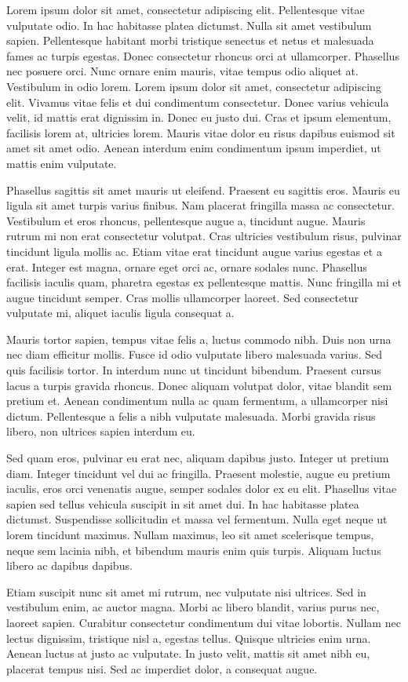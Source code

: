 \documentclass{article}
\begin{document}
Lorem ipsum dolor sit amet, consectetur adipiscing elit. Pellentesque vitae vulputate odio. In hac habitasse platea dictumst. Nulla sit amet vestibulum sapien. Pellentesque habitant morbi tristique senectus et netus et malesuada fames ac turpis egestas. Donec consectetur rhoncus orci at ullamcorper. Phasellus nec posuere orci. Nunc ornare enim mauris, vitae tempus odio aliquet at. Vestibulum in odio lorem. Lorem ipsum dolor sit amet, consectetur adipiscing elit. Vivamus vitae felis et dui condimentum consectetur. Donec varius vehicula velit, id mattis erat dignissim in. Donec eu justo dui. Cras et ipsum elementum, facilisis lorem at, ultricies lorem. Mauris vitae dolor eu risus dapibus euismod sit amet sit amet odio. Aenean interdum enim condimentum ipsum imperdiet, ut mattis enim vulputate.

Phasellus sagittis sit amet mauris ut eleifend. Praesent eu sagittis eros. Mauris eu ligula sit amet turpis varius finibus. Nam placerat fringilla massa ac consectetur. Vestibulum et eros rhoncus, pellentesque augue a, tincidunt augue. Mauris rutrum mi non erat consectetur volutpat. Cras ultricies vestibulum risus, pulvinar tincidunt ligula mollis ac. Etiam vitae erat tincidunt augue varius egestas et a erat. Integer est magna, ornare eget orci ac, ornare sodales nunc. Phasellus facilisis iaculis quam, pharetra egestas ex pellentesque mattis. Nunc fringilla mi et augue tincidunt semper. Cras mollis ullamcorper laoreet. Sed consectetur vulputate mi, aliquet iaculis ligula consequat a.

Mauris tortor sapien, tempus vitae felis a, luctus commodo nibh. Duis non urna nec diam efficitur mollis. Fusce id odio vulputate libero malesuada varius. Sed quis facilisis tortor. In interdum nunc ut tincidunt bibendum. Praesent cursus lacus a turpis gravida rhoncus. Donec aliquam volutpat dolor, vitae blandit sem pretium et. Aenean condimentum nulla ac quam fermentum, a ullamcorper nisi dictum. Pellentesque a felis a nibh vulputate malesuada. Morbi gravida risus libero, non ultrices sapien interdum eu.

Sed quam eros, pulvinar eu erat nec, aliquam dapibus justo. Integer ut pretium diam. Integer tincidunt vel dui ac fringilla. Praesent molestie, augue eu pretium iaculis, eros orci venenatis augue, semper sodales dolor ex eu elit. Phasellus vitae sapien sed tellus vehicula suscipit in sit amet dui. In hac habitasse platea dictumst. Suspendisse sollicitudin et massa vel fermentum. Nulla eget neque ut lorem tincidunt maximus. Nullam maximus, leo sit amet scelerisque tempus, neque sem lacinia nibh, et bibendum mauris enim quis turpis. Aliquam luctus libero ac dapibus dapibus.

Etiam suscipit nunc sit amet mi rutrum, nec vulputate nisi ultrices. Sed in vestibulum enim, ac auctor magna. Morbi ac libero blandit, varius purus nec, laoreet sapien. Curabitur consectetur condimentum dui vitae lobortis. Nullam nec lectus dignissim, tristique nisl a, egestas tellus. Quisque ultricies enim urna. Aenean luctus at justo ac vulputate. In justo velit, mattis sit amet nibh eu, placerat tempus nisi. Sed ac imperdiet dolor, a consequat augue.
\end{document}
